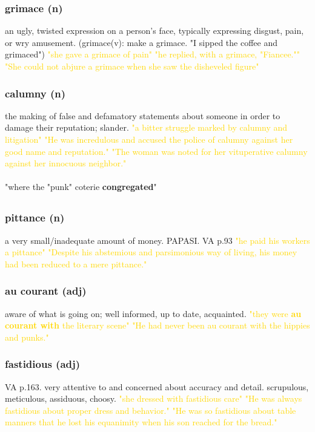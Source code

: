 \documentclass{proc}
\begin{document}
	\subsubsection{\textcolor{brickred}{grimace} (n)}
	an ugly, twisted expression on a person's face, typically expressing disgust, pain, or wry amusement.
	(grimace(v): make a grimace. "I sipped the coffee and grimaced")
	\textcolor{gold}{"she gave a grimace of pain" "he replied, with a grimace, "Fiancee."" "She could not abjure a grimace when she saw the disheveled figure"}
	
	\subsubsection{\textcolor{brickred}{calumny} (n)}
	the making of false and defamatory statements about someone in order to damage their reputation; slander.
	\textcolor{gold}{"a bitter struggle marked by calumny and litigation" "He was incredulous and accused the police of calumny against her good name and reputation." "The woman was noted for her vituperative calumny against her innocuous neighbor."}\\\\
	"where the "punk" coterie \textbf{congregated}"
	
	\newpage
	\subsection{}
	\subsubsection{\textcolor{brickred}{pittance} (n)}
	a very small/inadequate amount of money. PAPASI. VA p.93
	\textcolor{gold}{"he paid his workers a pittance" "Despite his abstemious and parsimonious way of  living,  his  money had been reduced to a  mere pittance."}
	
	\subsubsection{\textcolor{brickred}{au courant} (adj)}
	aware of what is going on; well informed, up to date, acquainted.
	\textcolor{gold}{"they were \textbf{au courant with} the literary scene" "He  had never been au courant with the hippies and punks."}
	
	\subsubsection{\textcolor{brickred}{fastidious} (adj)}
	VA p.163. very attentive to and concerned about accuracy and detail. scrupulous, meticulous, assiduous, choosy.
	\textcolor{gold}{"she dressed with fastidious care" "He was always fastidious about proper dress and behavior." "He was so fastidious about table manners that he lost his equanimity when his son reached for the bread."}
	
\end{document}
